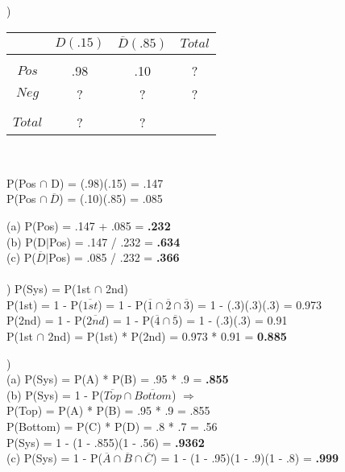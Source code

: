 \documentclass[12pt]{article}
\begin{document}
\begin{multicols}{2}
)
\begin{tabular}{c|cc|c}
 & $D(.15)$ & $\overline{D}(.85)$ & $Total$ \\
 \hline &&&\\[-1em]
$Pos$ & .98 & .10 & ?\\
$Neg$ & ? & ? & ?\\
 \hline &&&\\[-1em]
 $Total$ & ? & ? & 
\end{tabular}\\

\columnbreak 

\hfill \break
\noindent P(Pos $\cap$ D) = (.98)(.15) = .147\\
P(Pos $\cap \ \overline{D}$) = (.10)(.85) = .085\\

\end{multicols}



\indent (a) P(Pos) = .147 + .085 = \textbf{.232}\\
\indent (b) P(D$|$Pos) = .147 / .232 = \textbf{.634}\\
\indent (c) P($\overline{D}|$Pos) = .085 / .232 = \textbf{.366}\\


\noindent \hrulefill \\


) P(Sys) = P(1st $\cap$ 2nd) \\
\indent P(1st) = 1 - P($\overline{1st}$) = 1 - P($\overline{1} \cap \overline{2} \cap \overline{3}$) = 1 - (.3)(.3)(.3) = 0.973\\
\indent P(2nd) = 1 - P($\overline{2nd}$) = 1 - P($\overline{4} \cap \overline{5}$) = 1 - (.3)(.3) = 0.91\\
\indent P(1st $\cap$ 2nd) = P(1st) * P(2nd) = 0.973 * 0.91 = \textbf{0.885}\\


\noindent \hrulefill 
\pagebreak


)\\
\indent (a) P(Sys) = P(A) * P(B) = .95 * .9 = \textbf{.855}\\

\indent (b) P(Sys) = 1 - P($\overline{Top} \cap \overline{Bottom}$) $\Rightarrow$\\
\indent \indent P(Top) = P(A) * P(B) = .95 * .9 = .855\\
\indent \indent P(Bottom) = P(C) * P(D) = .8 * .7 = .56\\
\indent \indent P(Sys) = 1 - (1 - .855)(1 - .56) = \textbf{.9362}\\

\indent (c) P(Sys) = 1 -  P($\overline{A} \cap \overline{B} \cap \overline{C}$) = 1 - (1 - .95)(1 - .9)(1 - .8) = \textbf{.999}
\end{document}
